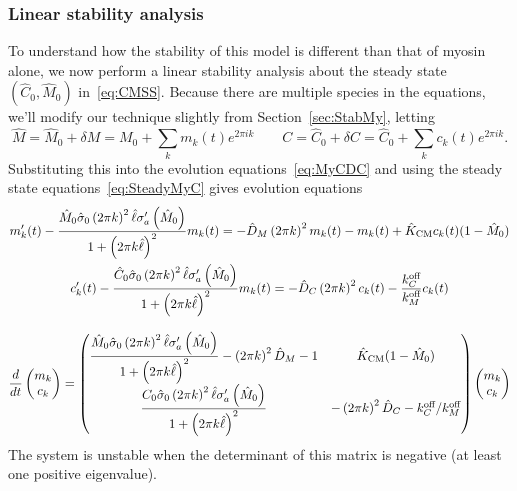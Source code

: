 \documentclass[11pt]{article}
\newcommand{\6}[1]{#1_{\text{6}}}
\newcommand{\3}[1]{#1_{\text{3}}}
\newcommand{\C}[1]{#1_C}
\newcommand{\My}[1]{#1_M}
\begin{document}
\subsubsection{Linear stability analysis}
To understand how the stability of this model is different than that of myosin alone, we now perform a linear stability analysis about the steady state $\left(\hat C_0, \hat M_0\right)$ in\ \eqref{eq:CMSS}. Because there are multiple species in the equations, we'll modify our technique slightly from Section\ \ref{sec:StabMy}, letting
\begin{equation}
\hat M = \hat M_0 + \delta M = M_0 + \sum_k m_k(t) e^{2 \pi i k} \qquad C = \hat C_0 + \delta C = \hat C_0 + \sum_k c_k(t) e^{2 \pi i k}.
\end{equation}
Substituting this into the evolution equations\ \eqref{eq:MyCDC} and using the steady state equations\ \eqref{eq:SteadyMyC} gives evolution equations
\begin{subequations}
\begin{gather}
m_k'(t) - \frac{\hat M_0 \hat{\sigma}_0 \left(2 \pi k\right)^2 \hat{\ell} \sigma_a'\left(\hat M_0\right)}{1 + \left(2 \pi k \hat{\ell}\right)^2} m_k(t) = -\hat{D}_M \left(2 \pi k\right)^2 m_k(t) - m_k(t) + \hat{K}_\text{CM} c_k(t)(1-\hat M_0)\\
c_k'(t)  - \frac{\hat C_0 \hat{\sigma}_0 \left(2 \pi k\right)^2 \hat{\ell} \sigma_a'\left(\hat M_0\right)}{1 + \left(2 \pi k \hat{\ell}\right)^2} m_k(t) = -\hat{D}_C \left(2 \pi k\right)^2 c_k(t) -\frac{\C{\koff}}{\My{\koff}}c_k(t)\\[8 pt] \label{eq:StabMatrix}
\frac{d}{dt} \begin{pmatrix} m_k \\ c_k \end{pmatrix} = 
\begin{pmatrix}
\displaystyle \frac{\hat M_0 \hat{\sigma}_0 \left(2 \pi k\right)^2 \hat{\ell} \sigma_a'\left(\hat M_0\right)}{1 + \left(2 \pi k \hat{\ell}\right)^2}- \left(2 \pi k\right)^2 \hat{D}_M -1 & \hat{K}_\text{CM}(1-\hat M_0) \\[8 pt]
\displaystyle  \frac{C_0 \hat{\sigma}_0 \left(2 \pi k\right)^2 \hat{\ell} \sigma_a'\left(\hat M_0\right)}{1 + \left(2 \pi k \hat{\ell}\right)^2} & -\left(2 \pi k\right)^2 \hat{D}_C -\C{\koff}/\My{\koff}
\end{pmatrix}
 \begin{pmatrix} m_k \\ c_k \end{pmatrix}
\end{gather}
\end{subequations}
The system is unstable when the determinant of this matrix is negative (at least one positive eigenvalue). 
\end{document}
